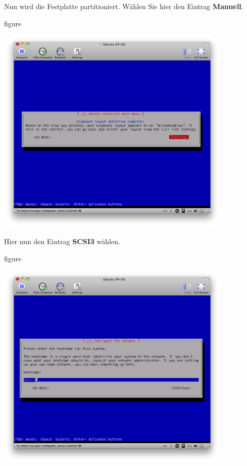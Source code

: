 Nun wird die Festplatte partitioniert. Wählen Sie hier den Eintrag \textbf{Manuell}.

\begin{nofloat}{figure}
\begin{center}
\includegraphics[width=0.85\textwidth]{screenshots/07_ubuntu_install.png}
\end{center}
\end{nofloat}

\pagebreak
Hier nun den Eintrag \textbf{SCSI3} wählen.

\begin{nofloat}{figure}
\begin{center}
\includegraphics[width=0.85\textwidth]{screenshots/08_ubuntu_install.png}
\end{center}
\end{nofloat}

